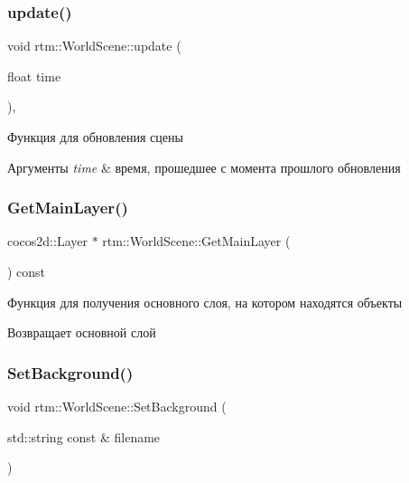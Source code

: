 \subsubsection{\texorpdfstring{update()}{update()}}
{\footnotesize\ttfamily void rtm\+::\+World\+Scene\+::update (\begin{DoxyParamCaption}\item[{float}]{time }\end{DoxyParamCaption})\hspace{0.3cm}{\ttfamily [override]}, {\ttfamily [virtual]}}

Функция для обновления сцены 
\begin{DoxyParams}{Аргументы}
{\em time} & время, прошедшее с момента прошлого обновления \\
\hline
\end{DoxyParams}
\mbox{\label{classrtm_1_1_world_scene_a33b06df7f231db363d6894408e16e225}} 
\subsubsection{\texorpdfstring{Get\+Main\+Layer()}{GetMainLayer()}}
{\footnotesize\ttfamily cocos2d\+::\+Layer $\ast$ rtm\+::\+World\+Scene\+::\+Get\+Main\+Layer (\begin{DoxyParamCaption}{ }\end{DoxyParamCaption}) const}

Функция для получения основного слоя, на котором находятся объекты \begin{DoxyReturn}{Возвращает}
основной слой 
\end{DoxyReturn}
\mbox{\label{classrtm_1_1_world_scene_accf4ad079366ad6ca9731bff83d937c0}} 
\subsubsection{\texorpdfstring{Set\+Background()}{SetBackground()}\hspace{0.1cm}{\footnotesize\ttfamily [1/2]}}
{\footnotesize\ttfamily void rtm\+::\+World\+Scene\+::\+Set\+Background (\begin{DoxyParamCaption}\item[{std\+::string const \&}]{filename }\end{DoxyParamCaption})}


